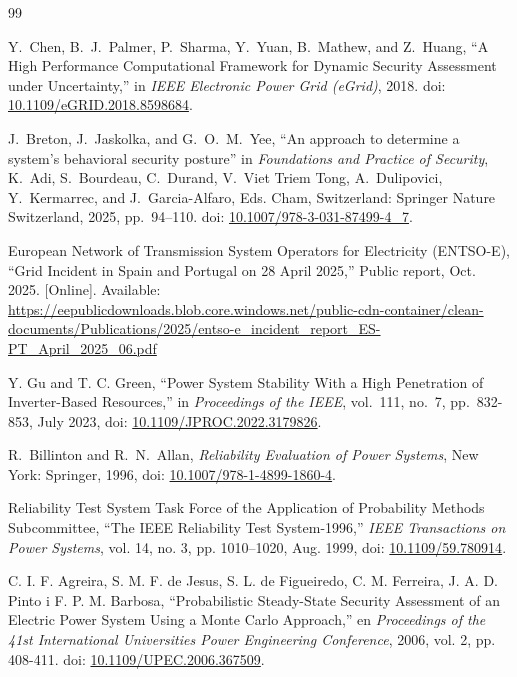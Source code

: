 \documentclass[journal]{IEEEtran}
\begin{document}

\begin{thebibliography}{99}

Y.~Chen, B.~J.~Palmer, P.~Sharma, Y.~Yuan, B.~Mathew, and Z.~Huang,
``A High Performance Computational Framework for Dynamic Security Assessment under Uncertainty,''
in \emph{IEEE Electronic Power Grid (eGrid)}, 2018.
doi: \href{https://doi.org/10.1109/eGRID.2018.8598684}{10.1109/eGRID.2018.8598684}.



J.~Breton, J.~Jaskolka, and G.~O.~M.~Yee,
``An approach to determine a system's behavioral security posture''
in \emph{Foundations and Practice of Security},
K.~Adi, S.~Bourdeau, C.~Durand, V.~Viet Triem Tong, A.~Dulipovici, 
Y.~Kermarrec, and J.~Garcia-Alfaro, Eds.
Cham, Switzerland: Springer Nature Switzerland, 2025, pp.~94--110.
doi: \href{https://doi.org/10.1007/978-3-031-87499-4_7}{10.1007/978-3-031-87499-4\_7}.

European Network of Transmission System Operators for Electricity (ENTSO-E),
``Grid Incident in Spain and Portugal on 28 April 2025,''
Public report, Oct. 2025.
[Online]. Available:
\url{https://eepublicdownloads.blob.core.windows.net/public-cdn-container/clean-documents/Publications/2025/entso-e_incident_report_ES-PT_April_2025_06.pdf}

Y. Gu and T. C. Green, 
``Power System Stability With a High Penetration of Inverter-Based Resources,'' 
in \emph{Proceedings of the IEEE}, vol.~111, no.~7, pp.~832-853, July 2023, 
doi: \href{https://doi.org/10.1109/JPROC.2022.3179826}{10.1109/JPROC.2022.3179826}.

R.~Billinton and R.~N.~Allan, \emph{Reliability Evaluation of Power Systems}, New York: Springer, 1996,
doi: \href{https://doi.org/10.1007/978-1-4899-1860-4}{10.1007/978-1-4899-1860-4}.

Reliability Test System Task Force of the Application of Probability Methods Subcommittee, ``The IEEE Reliability Test System-1996,'' \emph{IEEE Transactions on Power Systems}, vol. 14, no. 3, pp. 1010--1020, Aug. 1999,
doi: \href{https://doi.org/10.1109/59.780914}{10.1109/59.780914}.

C. I. F. Agreira, S. M. F. de Jesus, S. L. de Figueiredo, C. M. Ferreira, J. A. D. Pinto i F. P. M. Barbosa, 
“Probabilistic Steady-State Security Assessment of an Electric Power System Using a Monte Carlo Approach,” 
en \emph{Proceedings of the 41st International Universities Power Engineering Conference}, 2006, vol. 2, pp. 408-411. 
doi: \href{https://doi.org/10.1109/UPEC.2006.367509}{10.1109/UPEC.2006.367509}.


\end{thebibliography}
\end{document}
